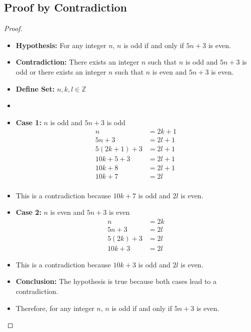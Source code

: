 \documentclass{article}
\begin{document}
\subsection*{Proof by Contradiction}
\begin{proof}
    \begin{itemize}
    \item[] \textbf{Hypothesis: } For any integer $n$, $n$ is odd if and only if $5n + 3$ is even.
    \item[] \textbf{Contradiction:} There exists an integer $n$ such that $n$ is odd and $5n + 3$ is odd or there exists an integer $n$ such that $n$ is even and $5n + 3$ is even.
    \item[] \textbf{Define Set: }$n, k, l \in \mathbb{Z}$
    \item[]
    \item[] \textbf{Case 1:} $n$ is odd and $5n + 3$ is odd
        \begin{align*}
        n &= 2k + 1 \\
        5n + 3 &= 2l + 1 \\
        5(2k + 1) + 3 &= 2l + 1 \\
        10k + 5 + 3 &= 2l + 1 \\
        10k + 8 &= 2l + 1 \\
        10k + 7 &= 2l \\
        \end{align*}
        \item[] This is a contradiction because $10k + 7$ is odd and $2l$ is even.
    \item[] \textbf{Case 2:} $n$ is even and $5n + 3$ is even
        \begin{align*}
        n &= 2k \\
        5n + 3 &= 2l \\
        5(2k) + 3 &= 2l \\
        10k + 3 &= 2l
        \end{align*}
        \item[] This is a contradiction because $10k + 3$ is odd and $2l$ is even.
    \item[] \textbf{Conclusion:} The hypothesis is true because both cases lead to a contradiction.
    \item[] Therefore, for any integer $n$, $n$ is odd if and only if $5n + 3$ is even.
    \end{itemize}
\end{proof}
\end{document}

